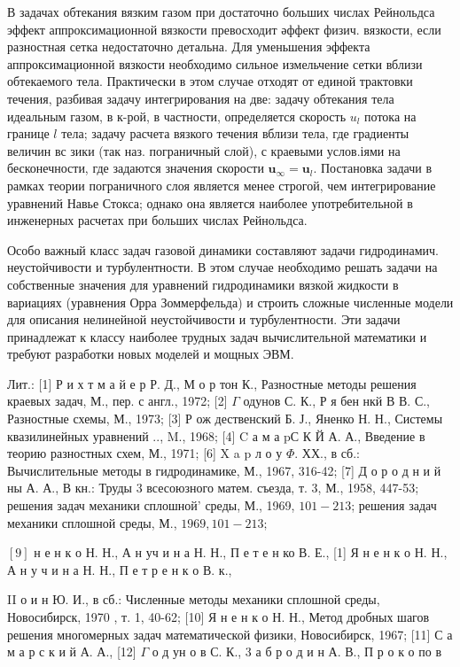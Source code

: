 \documentclass[10pt]{article}
\begin{document}
В задачах обтекания вязким газом при достаточно больших числах Рейнольдса эффект аппроксимационной вязкости превосходит әффект физич. вязкости, если разностная сетка недостаточно детальна. Для уменьшения эффекта аппроксимационной вязкости необходимо сильное измельчение сетки вблизи обтекаемого тела. Практически в этом случае отходят от единой трактовки течения, разбивая задачу интегрирования на две: задачу обтекания тела идеальным газом, в к-рой, в частности, определяется скорость $u_{l}$ потока на границе $l$ тела; задачу расчета вязкого течения вблизи тела, где градиенты величин вс зики (так наз. пограничный слой), с краевыми услов.іями на бесконечности, где задаются значения скорости $\boldsymbol{u}_{\infty}=\boldsymbol{u}_{l}$. Постановка задачи в рамках теории пограничного слоя является менее строгой, чем интегрирование уравнений Навье Стокса; однако она является наиболее употребительной в инженерных расчетах при больших числах Рейнольдса.



Особо важный класс задач газовой динамики составляют задачи гидродинамич. неустойчивости и турбулентности. В этом случае необходимо решать задачи на собственные значения для уравнений гидродинамики вязкой жидкости в вариациях (уравнения Орра Зоммерфельда) и строить сложные численные модели для описания нелинейной неустойчивости и турбулентности. Эти задачи принадлежат к классу наиболее трудных задач вычислительной математики и требуют разработки новых моделей и мощных ЭВМ.



Лит.: [1] Р и х т м а й е р Р. Д., М о р тон К., Разностные методы решения краевых задач, М., пер. с англ., 1972; [2] $\Gamma$ одунов С. К., Р я бен нкй В В. С., Разностные схемы, М., 1973; [3] Р ож дественский Б. Ј., Яненко Н. Н., Системы квазилинейных уравнений .., M., 1968; [4] C а м а pС К Й А. А., Введение в теорию разностных схем, М., 1971; [6] X a p л о у $\Phi$. ХХ., в сб.: Вычислительные методы в гидродинамике, М., 1967, 316-42; [7] Д о р о д н и й ны А. А., В кн.: Труды 3 всесоюзного матем. съезда, т. 3, М., 1958, 447-53; решения задач механики сплошной' среды, М., 1969, $101-213$; решения задач механики сплошной среды, М., $1969,101-213 ;$

$[9]$ н е н к о Н. Н., А н уч и н а Н. Н., П е т е н ко В. Е., [1] Я н е н к о Н. Н., А н у ч и н а Н. Н., П е т р е н к о В. к.,

II о и н Ю. И., в сб.: Численные методы механики сплошной среды, Новосибирск, 1970 , т. 1, 40-62; [10] Я н е н к о Н. Н., Метод дробных шагов решения многомерных задач математической физики, Новосибирск, 1967; [11] С а м а р с к и й А. А., [12] $\Gamma$ о д ун о в С. К., 3 а б р о д и н А. В., П р о к о по в
\end{document}
